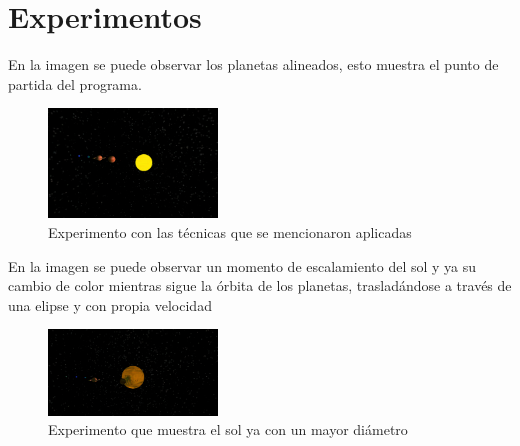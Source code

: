 \documentclass[12pt,journal,compsoc]{IEEEtran}
\begin{document}
\section{Experimentos}
En la imagen se puede observar los planetas alineados, esto muestra el punto de partida del programa.
%
\begin{figure}[h!]
	\includegraphics[width=0.4\textwidth, height=0.25\textwidth]{1.png}
	\centering
	\caption{Experimento con las técnicas que se mencionaron aplicadas}
\end{figure}
%
En la imagen se puede observar un momento de escalamiento del sol y ya su cambio de color mientras sigue la órbita de los planetas, trasladándose a través de una elipse y con propia velocidad
%
\begin{figure}[h!]
	\includegraphics[width=0.4\textwidth, height=0.25\textwidth]{2.png}
	\centering
	\caption{Experimento que muestra el sol ya con un mayor diámetro}
\end{figure}
%
%
\end{document}
